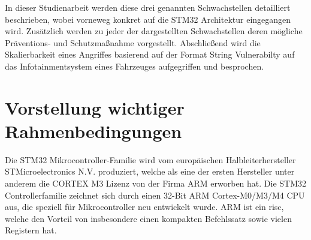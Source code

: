 \documentclass[a4paper,
DIV=13,
12pt,
BCOR=10mm,
department=FakIM,
oneside,
parskip=half,
automark,
listof=totocnumbered,
bibliography=totocnumbered,
acronym=totocnumbered
] {OTHRartcl}
\begin{document}
In dieser Studienarbeit werden diese drei genannten Schwachstellen detailliert beschrieben, wobei vorneweg konkret auf die STM32 Architektur eingegangen wird.
Zusätzlich werden zu jeder der dargestellten Schwachstellen deren mögliche Präventions- und Schutzmaßnahme vorgestellt.
Abschließend wird die Skalierbarkeit eines Angriffes basierend auf der Format String Vulnerabilty auf das Infotainmentsystem eines Fahrzeuges aufgegriffen und besprochen.


\section{Vorstellung wichtiger Rahmenbedingungen}
\label{sec:VorstellungwichtigerRahmenbedinungen}

Die STM32 Mikrocontroller-Familie wird vom europäischen Halbleiterhersteller STMicroelectronics N.V. produziert, welche als eine der ersten Hersteller unter anderem
die CORTEX M3 Lizenz von der Firma ARM erworben hat.
Die STM32 Controllerfamilie zeichnet sich durch einen 32-Bit ARM Cortex-M0/M3/M4 CPU aus, die speziell für Mikrocontroller neu entwickelt wurde.
ARM ist ein \ac{risc}, welche den Vorteil von insbesondere einen kompakten Befehlssatz sowie vielen Registern hat.
\end{document}
